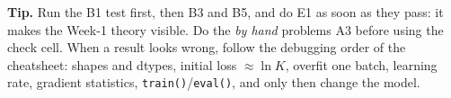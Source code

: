\documentclass[11pt,a4paper]{article}
\begin{document}
\begin{notebox}
\textbf{Tip.} Run the B1 test first, then B3 and B5, and do E1 as soon as they pass: it makes the Week-1 theory visible. Do the \emph{by hand} problems A3 before using the check cell. When a result looks wrong,
follow the debugging order of the cheatsheet: shapes and dtypes, initial loss $\approx\ln K$, overfit one batch, learning rate, gradient statistics, \texttt{train()}/\texttt{eval()}, and only then change the model.
\end{notebox}
\end{document}
